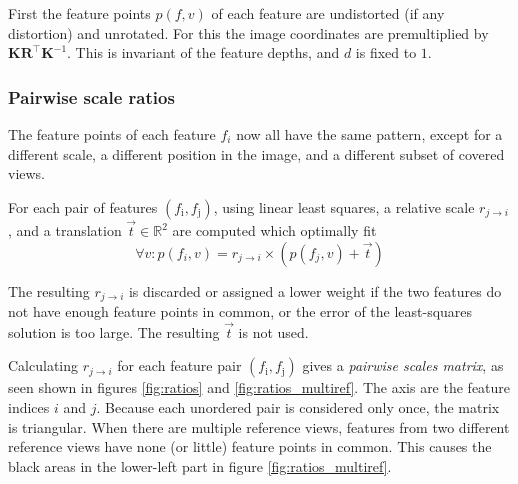 \documentclass{scrreprt}
\newcommand{\matr}[1]{\mathbf{#1}}
\newcommand{\transpose}[1]{#1^\intercal}
\begin{document}
First the feature points $p(f,v)$ of each feature are undistorted (if any distortion) and unrotated. For this the image coordinates are premultiplied by $\matr{K} \transpose{\matr{R}} \matr{K}^{-1}$. This is invariant of the feature depths, and $d$ is fixed to $1$.

\subsubsection{Pairwise scale ratios}
The feature points of each feature $f_i$ now all have the same pattern, except for a different scale, a different position in the image, and a different subset of covered views.

For each pair of features $(f_\text{i}, f_\text{j})$, using linear least squares, a relative scale $r_{j\rightarrow i}$, and a translation $\vec{t} \in \mathbb{R}^2$ are computed which optimally fit
\begin{equation*}
\forall v : p(f_i, v) = r_{j\rightarrow i} \times \left( p(f_j, v) + \vec{t} \right)
\end{equation*}

The resulting $r_{j\rightarrow i}$ is discarded or assigned a lower weight if the two features do not have enough feature points in common, or the error of the least-squares solution is too large. The resulting $\vec{t}$ is not used.

Calculating $r_{j\rightarrow i}$ for each feature pair $(f_\text{i}, f_\text{j})$ gives a \emph{pairwise scales matrix}, as seen shown in figures \ref{fig:ratios} and \ref{fig:ratios_multiref}. The axis are the feature indices $i$ and $j$. Because each unordered pair is considered only once, the matrix is triangular. When there are multiple reference views, features from two different reference views have none (or little) feature points in common. This causes the black areas in the lower-left part in figure \ref{fig:ratios_multiref}.
\end{document}
